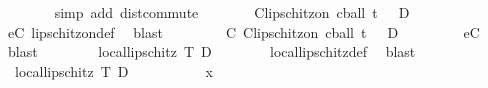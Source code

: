 \begin{isabellebody}
\ \ \ \ \ \ \isamarkupfalse%
\ {\isacharparenleft}{\kern0pt}simp\ add{\isacharcolon}{\kern0pt}\ dist{\isacharunderscore}{\kern0pt}commute{\isacharparenright}{\kern0pt}\isanewline
\ \ \ \ \isamarkupfalse%
\ \isamarkupfalse%
\ {\isachardoublequoteopen}C{\isacharminus}{\kern0pt}lipschitz{\isacharunderscore}{\kern0pt}on\ {\isacharparenleft}{\kern0pt}{\isacharparenleft}{\kern0pt}cball\ t\ {\isasymepsilon}{\isacharparenright}{\kern0pt}\ {\isasyminter}\ D{\isacharparenright}{\kern0pt}\ {\isasymphi}{\isachardoublequoteclose}\isanewline
\ \ \ \ \ \ \isamarkupfalse%
\ eC\ lipschitz{\isacharunderscore}{\kern0pt}on{\isacharunderscore}{\kern0pt}def\ \isamarkupfalse%
\ blast\isanewline
\ \ \ \ \isamarkupfalse%
\ \isamarkupfalse%
\ {\isachardoublequoteopen}{\isasymexists}{\isasymepsilon}{\isachargreater}{\kern0pt}{}{\isachardot}{\kern0pt}\ {\isasymexists}C{\isachardot}{\kern0pt}\ C{\isacharminus}{\kern0pt}lipschitz{\isacharunderscore}{\kern0pt}on\ {\isacharparenleft}{\kern0pt}{\isacharparenleft}{\kern0pt}cball\ t\ {\isasymepsilon}{\isacharparenright}{\kern0pt}\ {\isasyminter}\ D{\isacharparenright}{\kern0pt}\ {\isasymphi}{\isachardoublequoteclose}\isanewline
\ \ \ \ \ \ \isamarkupfalse%
\ eC{\isacharparenleft}{\kern0pt}{}{\isacharparenright}{\kern0pt}\ \isamarkupfalse%
\ blast\isanewline
\ \ \isacommand{{\isacharbraceright}{\kern0pt}}\isamarkupfalse%
\isanewline
\ \ \isamarkupfalse%
\ \isamarkupfalse%
\ {\isachardoublequoteopen}local{\isacharunderscore}{\kern0pt}lipschitz\ T\ D\ {\isacharparenleft}{\kern0pt}{\isasymlambda}{\isacharunderscore}{\kern0pt}{\isachardot}{\kern0pt}\ {\isasymphi}{\isacharparenright}{\kern0pt}{\isachardoublequoteclose}\isanewline
\ \ \ \ \isamarkupfalse%
\ local{\isacharunderscore}{\kern0pt}lipschitz{\isacharunderscore}{\kern0pt}def\ \isamarkupfalse%
\ blast\isanewline
{}\isamarkupfalse%
\isanewline
\ \ \isamarkupfalse%
\ {\isacharasterisk}{\kern0pt}{\isacharcolon}{\kern0pt}\ {\isachardoublequoteopen}local{\isacharunderscore}{\kern0pt}lipschitz\ T\ D\ {\isacharparenleft}{\kern0pt}{\isasymlambda}{\isacharunderscore}{\kern0pt}{\isachardot}{\kern0pt}\ {\isasymphi}{\isacharparenright}{\kern0pt}{\isachardoublequoteclose}\isanewline
\ \ \isacommand{{\isacharbraceleft}{\kern0pt}}\isamarkupfalse%
\isanewline
\ \ \ \ \isamarkupfalse%
\ x\ \isamarkupfalse%

\end{isabellebody}
